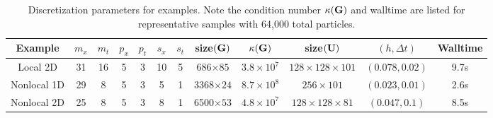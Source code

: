 \documentclass[english,reqno]{amsart}
\begin{document}
\begin{table}
\begin{center}
\hspace{-2cm}\begin{tabular}{|c|c|c|c|c|c|c|c|c|c|c|c|}
\hline
Example & $m_x$ & $m_t$ & $p_x$ & $p_t$ & $s_x$ & $s_t$ &  size$(\mathbf{G})$ & $\kappa(\mathbf{G})$ & size$(\mathbf{U})$ & $(h,\Delta t)$ & Walltime \\ \hline
Local 2D & 31 & 16 & 5 & 3 & 10 & 5& 686$\times 85$ & $3.8\times 10^7$ & $128\times 128 \times 101$ & $(0.078,0.02)$& 9.7s\\\hline
Nonlocal 1D & 29 & 8 & 5 & 3 & 5 & 1  & 3368$\times 24$ & $8.7\times 10^8$ & $256\times 101$ & $(0.023,0.01)$ & 2.6s\\\hline
Nonlocal 2D & 25 & 8 & 5 & 3 & 8 & 1  & 6500$\times 53$ & $4.8\times 10^7$ & $128\times 128\times 81$ & $(0.047,0.1)$ & 8.5s\\\hline
\end{tabular}
\end{center}
\caption{Discretization parameters for examples. Note the condition number $\kappa(\mathbf{G})$ and walltime are listed for representative samples with 64,000 total particles.}
\label{specs}
\end{table}


\end{document}
